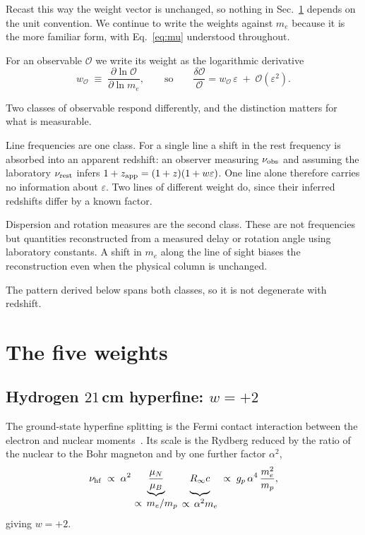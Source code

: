 \documentclass[aps,prd,twocolumn,superscriptaddress,nofootinbib,10pt]{revtex4-2}
\begin{document}
Recast this way the weight vector is unchanged, so nothing in Sec.~\ref{sec:weights} depends on the
unit convention. We continue to write the weights against $m_e$ because it is the more familiar
form, with Eq.~\eqref{eq:mu} understood throughout.

For an observable $\mathcal{O}$ we write its weight as the logarithmic derivative
%
\begin{equation}
  w_{\mathcal{O}} \;\equiv\; \frac{\partial \ln \mathcal{O}}{\partial \ln m_e},
  \qquad\text{so}\qquad
  \frac{\delta \mathcal{O}}{\mathcal{O}} = w_{\mathcal{O}}\,\varepsilon
  \;+\; \mathcal{O}(\varepsilon^2).
  \label{eq:weight}
\end{equation}

Two classes of observable respond differently, and the distinction matters for what is measurable.

Line frequencies are one class. For a single line a shift in the rest frequency is absorbed into
an apparent redshift: an observer measuring $\nu_{\rm obs}$ and assuming the laboratory
$\nu_{\rm rest}$ infers $1+z_{\rm app} = (1+z)(1+w\varepsilon)$. One line alone therefore carries
no information about $\varepsilon$. Two lines of different weight do, since their inferred
redshifts differ by a known factor.

Dispersion and rotation measures are the second class. These are not frequencies but quantities
reconstructed from a measured delay or rotation angle using laboratory constants. A shift in $m_e$
along the line of sight biases the reconstruction even when the physical column is unchanged.

The pattern derived below spans both classes, so it is not degenerate with redshift.

\section{The five weights}\label{sec:weights}

\subsection{Hydrogen $21\,$cm hyperfine: $w = +2$}

The ground-state hyperfine splitting is the Fermi contact interaction between the electron and
nuclear moments~\cite{WolfeBrownRoberts1976,Tzanavaris2005}. Its scale is the Rydberg reduced by
the ratio of the nuclear to the Bohr
magneton and by one further factor $\alpha^2$,
%
\begin{equation}
  \nu_{\rm hf} \;\propto\; \alpha^{2}\,
  \underbrace{\frac{\mu_N}{\mu_B}}_{\textstyle \propto\, m_e/m_p}\;
  \underbrace{\vphantom{\frac{\mu_N}{\mu_B}} R_\infty c}_{\textstyle \propto\, \alpha^{2} m_e}
  \;\propto\; g_p\,\alpha^{4}\,\frac{m_e^{2}}{m_p},
  \label{eq:hf}
\end{equation}
%
giving $w = +2$.
\end{document}

